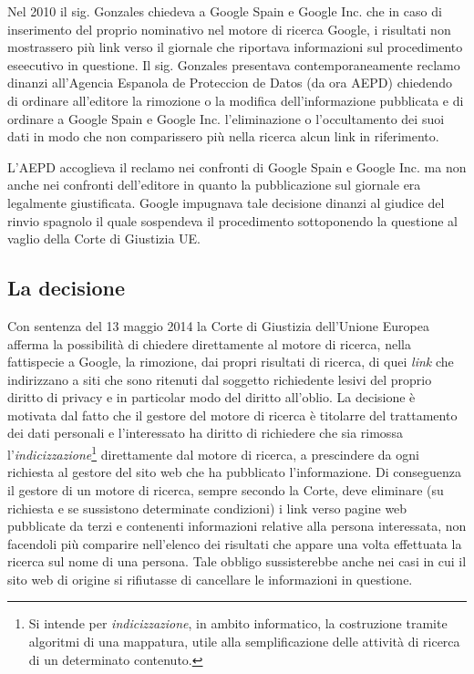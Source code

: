 Nel 2010 il sig. Gonzales chiedeva a Google Spain e Google Inc. che in caso di inserimento del  proprio nominativo nel motore di ricerca Google, i risultati non mostrassero più link verso il giornale che riportava informazioni sul procedimento eseecutivo in questione. Il  sig. Gonzales presentava contemporaneamente reclamo dinanzi all'Agencia Espanola de Proteccion de Datos (da ora AEPD) chiedendo di ordinare all'editore la rimozione o la modifica dell'informazione pubblicata e di ordinare a Google Spain e Google Inc. l'eliminazione o l'occultamento dei suoi dati in modo che non comparissero più nella ricerca alcun link in riferimento.

L'AEPD accoglieva il reclamo nei confronti di Google Spain e Google Inc. ma non anche nei confronti dell'editore in quanto la pubblicazione sul giornale era legalmente giustificata.
Google impugnava tale decisione dinanzi al giudice del rinvio spagnolo il quale sospendeva il procedimento sottoponendo la questione al vaglio della Corte di Giustizia UE.
\subsection{La decisione}
Con sentenza del 13 maggio 2014 la Corte di Giustizia dell'Unione Europea afferma la possibilità di chiedere direttamente al motore di ricerca, nella fattispecie a Google, la rimozione, dai propri risultati di ricerca, di quei \textit{link} che indirizzano a siti che sono ritenuti dal soggetto richiedente lesivi del proprio diritto di privacy e in particolar modo del diritto all'oblio.
La decisione è motivata dal fatto che il gestore del motore di ricerca è titolarre del trattamento dei dati personali e l'interessato ha diritto di richiedere che sia rimossa l'\textit{indicizzazione}\footnote{Si intende per \textit{indicizzazione}, in ambito informatico, la costruzione tramite algoritmi di una mappatura, utile alla semplificazione delle attività di ricerca di un determinato contenuto.} direttamente dal motore di ricerca, a prescindere da ogni richiesta al gestore del sito web che ha pubblicato l'informazione. Di conseguenza il gestore di un motore di ricerca, sempre secondo la Corte, deve eliminare (su richiesta e se sussistono determinate condizioni) i link verso pagine web pubblicate da terzi e contenenti informazioni relative alla persona interessata, non facendoli più comparire nell'elenco dei risultati che appare una volta effettuata la ricerca sul nome di una persona. Tale obbligo sussisterebbe anche nei casi in cui il sito web di origine si rifiutasse di cancellare  le informazioni in questione.
